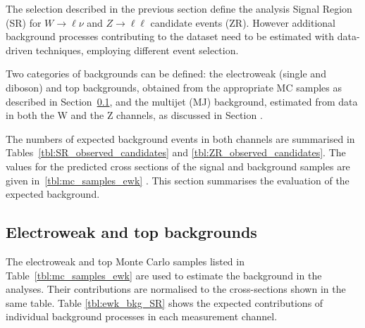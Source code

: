 
The selection described in the previous section define the analysis Signal Region (SR) for $W \rightarrow \ell\nu$ and  $ Z \rightarrow \ell\ell$ candidate events (ZR).
However additional background processes contributing to the dataset need to be estimated with data-driven techniques, employing different event selection.

Two categories of backgrounds can be defined: the electroweak (single and diboson) and top backgrounds, obtained from the appropriate MC samples as described in Section~\ref{sec:bkg_EWK}, and the multijet (MJ) background, estimated from data in both the W and the Z channels, as discussed in Section \cite{sec:bkg_mj}.

The numbers of expected background events in both channels are summarised in Tables~\ref{tbl:SR_observed_candidates} and \ref{tbl:ZR_observed_candidates}.
The values for the predicted cross sections of the signal and background samples
are given in~\ref{tbl:mc_samples_ewk} \cite{CrossSectionHighOrder,SMDC14xsecs,TtbarNNLO}.
This section summarises the evaluation of the expected background.

\subsection{Electroweak and top backgrounds}
\label{sec:bkg_EWK}

The electroweak and top Monte Carlo samples listed in Table~\ref{tbl:mc_samples_ewk} are used to estimate the background in the analyses.
Their contributions are normalised to the cross-sections shown in the same table.
Table \ref{tbl:ewk_bkg_SR} shows the expected contributions of individual background processes in each measurement channel.

